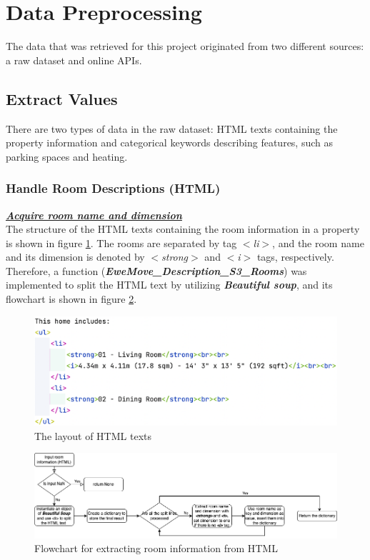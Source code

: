 \documentclass[12pt,twoside]{report}
\begin{document}
\section{Data Preprocessing}
The data that was retrieved for this project originated from two different sources: a raw dataset and online APIs. 

\subsection{Extract Values}
There are two types of data in the raw dataset: HTML texts containing the property information and categorical keywords describing features, such as parking spaces and heating.

\subsubsection{Handle Room Descriptions (HTML)}
\textbf{\textit{\underline{Acquire room name and dimension}}} \\
The structure of the HTML texts containing the room information in a property is shown in figure \ref{html_structure}. The rooms are separated by tag \textit{$<$li$>$}, and the room name and its dimension is denoted by \textit{$<$strong$>$} and \textit{$<$i$>$} tags, respectively. Therefore, a function (\textit{\textbf{EweMove\_Description\_S3\_Rooms}}) was implemented to split the HTML text by utilizing \textit{\textbf{Beautiful soup}}, and its flowchart is shown in figure \ref{html_room_info}.
\begin{figure}[h]
	\centering
	\includegraphics[width=15cm]{html_structure}
	\caption{The layout of HTML texts}
	\label{html_structure}
\end{figure}

\begin{figure}[h]
	\centering
	\includegraphics[width=15cm]{html_room_info}
	\caption{Flowchart for extracting room information from HTML}
	\label{html_room_info}
\end{figure}
\end{document}

